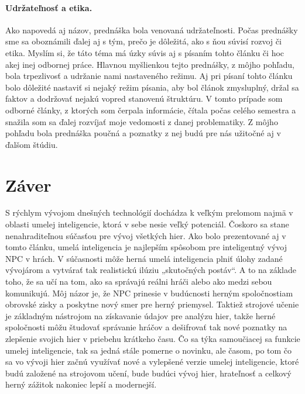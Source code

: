 \documentclass[10pt,twoside,slovak,a4paper]{article}
\begin{document}
\paragraph{Udržateľnosť a etika.}Ako napovedá aj názov, prednáška bola venovaná udržateľnosti. Počas prednášky sme sa oboznámili ďalej aj s tým, prečo je dôležitá, ako s ňou súvisí rozvoj či etika. Myslím si, že táto téma má úzky súvis aj s písaním tohto článku či hoc akej inej odbornej práce. Hlavnou myšlienkou tejto prednášky, z môjho pohľadu, bola trpezlivosť a udržanie nami nastaveného režimu. Aj pri písaní tohto článku bolo dôležité nastaviť si nejaký režim písania, aby bol článok zmysluplný, držal sa faktov a dodržovať nejakú vopred stanovenú štruktúru. V tomto prípade som odborné články, z ktorých som čerpala informácie, čítala počas celého semestra a snažila som sa ďalej rozvíjať moje vedomosti z danej problematiky. Z môjho pohľadu bola prednáška poučná a poznatky z nej budú pre nás užitočné aj v ďalšom štúdiu. 


\section{Záver} \label{zaver} 
\quad S rýchlym vývojom dnešných technológií dochádza k veľkým prelomom najmä v oblasti umelej inteligencie, ktorá v sebe nesie veľký potenciál. Čoskoro sa stane nenahraditeľnou súčasťou pre vývoj všetkých hier. Ako bolo prezentované aj v tomto článku, umelá inteligencia je najlepším spôsobom pre inteligentný vývoj NPC v hrách. V súčasnosti môže herná umelá inteligencia plniť úlohy zadané vývojárom a vytvárať tak realistickú ilúziu „skutočných postáv“. A to na základe toho, že sa učí na tom, ako sa správajú reálni hráči alebo ako medzi sebou komunikujú. Môj názor je, že NPC prinesie v budúcnosti herným spoločnostiam obrovské zisky a poskytne nový smer pre herný priemysel. Taktiež strojové učenie je základným nástrojom na získavanie údajov pre analýzu hier, takže herné spoločnosti môžu študovať správanie hráčov a dešifrovať tak nové poznatky na zlepšenie svojich hier v priebehu krátkeho času. Čo sa týka samoučiacej sa funkcie umelej inteligencie, tak sa jedná stále pomerne o novinku, ale časom, po tom čo sa vo vývoji hier začnú využívať nové a vylepšené verzie umelej inteligencie, ktoré budú založené na strojovom učení, bude budúci vývoj hier, hrateľnosť a celkový herný zážitok nakoniec lepší a modernejší.







\end{document}
